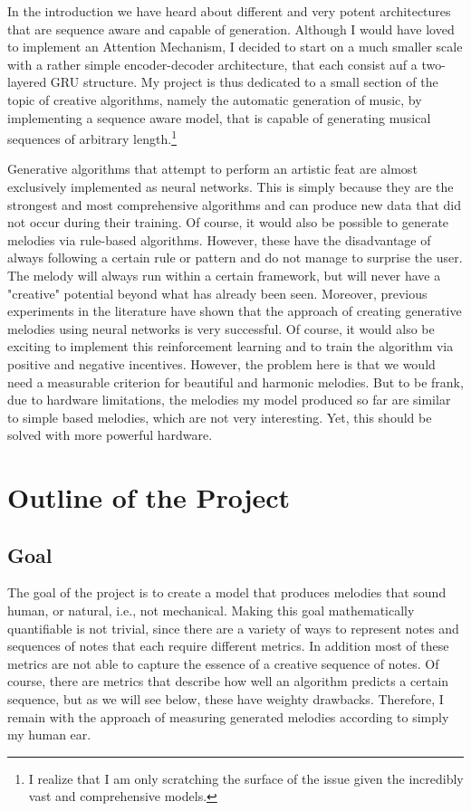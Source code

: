 \documentclass[a4paper, 10pt, xcolor=dvipsnames]{article} %
\begin{document}
In the introduction we have heard about different and very potent architectures
that are sequence aware and capable of generation. Although I would have loved
to implement an Attention Mechanism, I decided to start on a much smaller scale
with a rather simple encoder-decoder architecture, that each consist auf a
two-layered GRU structure. My project is thus dedicated to a small section of
the topic of creative algorithms, namely the automatic generation of music, by
implementing a sequence aware model, that is capable of generating musical
sequences of arbitrary length.\footnote{I realize that I am only scratching the
  surface of the issue given the incredibly vast and comprehensive models.}

Generative algorithms that attempt to perform an artistic feat are almost
exclusively implemented as neural networks. This is simply because they are the
strongest and most comprehensive algorithms and can produce new data that did
not occur during their training. Of course, it would also be possible to
generate melodies via rule-based algorithms. However, these have the
disadvantage of always following a certain rule or pattern and do not manage to
surprise the user. The melody will always run within a certain framework, but
will never have a "creative" potential beyond what has already been seen.
Moreover, previous experiments in the literature have shown that the approach
of creating generative melodies using neural networks is very successful. Of
course, it would also be exciting to implement this reinforcement learning and
to train the algorithm via positive and negative incentives. However, the
problem here is that we would need a measurable criterion for beautiful and
harmonic melodies. But to be frank, due to hardware limitations, the melodies
my model produced so far are similar to simple based melodies, which are not
very interesting. Yet, this should be solved with more powerful hardware.

\section{Outline of the Project}
\subsection{Goal}
The goal of the project is to create a model that produces melodies that sound
human, or natural, i.e., not mechanical. Making this goal mathematically
quantifiable is not trivial, since there are a variety of ways to represent
notes and sequences of notes that each require different metrics. In addition
most of these metrics are not able to capture the essence of a creative
sequence of notes. Of course, there are metrics that describe how well an
algorithm predicts a certain sequence, but as we will see below, these have
weighty drawbacks. Therefore, I remain with the approach of measuring generated
melodies according to simply my human ear.
\end{document}
